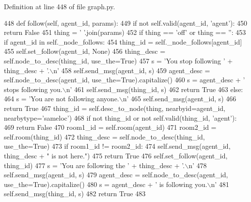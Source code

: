 Definition at line 448 of file graph.\+py.


\begin{DoxyCode}
448     \textcolor{keyword}{def }follow(self, agent\_id, params):
449         \textcolor{keywordflow}{if} \textcolor{keywordflow}{not} self.valid(agent\_id, \textcolor{stringliteral}{'agent'}):
450             \textcolor{keywordflow}{return} \textcolor{keyword}{False}
451         thing = \textcolor{stringliteral}{' '}.join(params)
452         \textcolor{keywordflow}{if} thing == \textcolor{stringliteral}{'off'} \textcolor{keywordflow}{or} thing == \textcolor{stringliteral}{''}:
453             \textcolor{keywordflow}{if} agent\_id \textcolor{keywordflow}{in} self.\_node\_follows:
454                 thing\_id = self.\_node\_follows[agent\_id]
455                 self.set\_follow(agent\_id, \textcolor{keywordtype}{None})
456                 thing\_desc = self.node\_to\_desc(thing\_id, use\_the=\textcolor{keyword}{True})
457                 s = \textcolor{stringliteral}{'You stop following '} + thing\_desc + \textcolor{stringliteral}{'.\(\backslash\)n'}
458                 self.send\_msg(agent\_id, s)
459                 agent\_desc = self.node\_to\_desc(agent\_id, use\_the=\textcolor{keyword}{True}).capitalize()
460                 s = agent\_desc + \textcolor{stringliteral}{' stops following you.\(\backslash\)n'}
461                 self.send\_msg(thing\_id, s)
462                 \textcolor{keywordflow}{return} \textcolor{keyword}{True}
463             \textcolor{keywordflow}{else}:
464                 s = \textcolor{stringliteral}{'You are not following anyone.\(\backslash\)n'}
465                 self.send\_msg(agent\_id, s)
466                 \textcolor{keywordflow}{return} \textcolor{keyword}{True}
467         thing\_id = self.desc\_to\_node(thing, nearbyid=agent\_id, nearbytype=\textcolor{stringliteral}{'sameloc'})
468         \textcolor{keywordflow}{if} \textcolor{keywordflow}{not} thing\_id \textcolor{keywordflow}{or} \textcolor{keywordflow}{not} self.valid(thing\_id, \textcolor{stringliteral}{'agent'}):
469             \textcolor{keywordflow}{return} \textcolor{keyword}{False}
470         room1\_id = self.room(agent\_id)
471         room2\_id = self.room(thing\_id)
472         thing\_desc = self.node\_to\_desc(thing\_id, use\_the=\textcolor{keyword}{True})
473         \textcolor{keywordflow}{if} room1\_id != room2\_id:
474             self.send\_msg(agent\_id, thing\_desc + \textcolor{stringliteral}{" is not here."})
475             \textcolor{keywordflow}{return} \textcolor{keyword}{True}
476         self.set\_follow(agent\_id, thing\_id)
477         s = \textcolor{stringliteral}{'You are following the '} + thing\_desc + \textcolor{stringliteral}{'.\(\backslash\)n'}
478         self.send\_msg(agent\_id, s)
479         agent\_desc = self.node\_to\_desc(agent\_id, use\_the=\textcolor{keyword}{True}).capitalize()
480         s = agent\_desc + \textcolor{stringliteral}{' is following you.\(\backslash\)n'}
481         self.send\_msg(thing\_id, s)
482         \textcolor{keywordflow}{return} \textcolor{keyword}{True}
483 
\end{DoxyCode}
